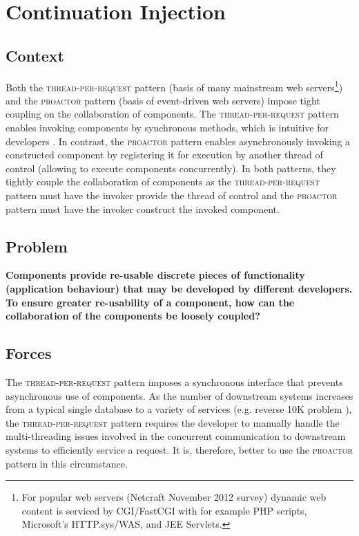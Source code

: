 \documentclass[prodmode]{style/acmlarge}
\begin{document}
\section{Continuation Injection}


\subsection{Context}

Both the \textsc{thread-per-request} pattern \cite{thread-per-request} (basis of
many mainstream web servers\footnote{For popular web servers (Netcraft November
2012 survey) dynamic web content is serviced by CGI/FastCGI with for example PHP
scripts, Microsoft's HTTP.sys/WAS, and JEE Servlets.}) and the \textsc{proactor}
pattern \cite{proactor} (basis of event-driven web servers) impose tight
coupling on the collaboration of components.  The \textsc{thread-per-request}
pattern enables invoking components by synchronous methods, which is intuitive
for developers \cite[p. 2]{proactor}.  In contrast, the \textsc{proactor}
pattern enables asynchronously invoking a constructed component by registering
it for execution by another thread of control (allowing to execute components
concurrently).  In both patterns, they tightly couple the collaboration of
components as the \textsc{thread-per-request} pattern must have the invoker
provide the thread of control and the \textsc{proactor} pattern must have the
invoker construct the invoked component.


\subsection{Problem}

\textbf{Components provide re-usable discrete pieces of functionality
(application behaviour) that may be developed by different developers.  To
ensure greater re-usability of a component, how can the collaboration of the
components be loosely coupled?}


\subsection{Forces}

The \textsc{thread-per-request} pattern imposes a synchronous interface that
prevents asynchronous use of components.  As the number of downstream systems
increases from a typical single database to a variety of services (e.g.
reverse 10K problem \cite{reverse-ten-k-problem}), the
\textsc{thread-per-request} pattern requires the developer to manually handle
the multi-threading issues involved in the concurrent communication to
downstream systems to efficiently service a request.  It is, therefore, better
to use the \textsc{proactor} pattern in this circumstance.
\end{document}
